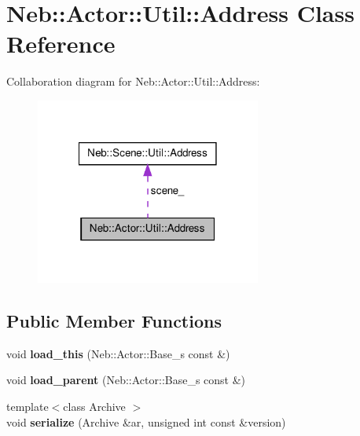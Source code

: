 \hypertarget{classNeb_1_1Actor_1_1Util_1_1Address}{\section{\-Neb\-:\-:\-Actor\-:\-:\-Util\-:\-:\-Address \-Class \-Reference}
\label{classNeb_1_1Actor_1_1Util_1_1Address}
}


\-Collaboration diagram for \-Neb\-:\-:\-Actor\-:\-:\-Util\-:\-:\-Address\-:\nopagebreak
\begin{figure}[H]
\begin{center}
\leavevmode
\includegraphics[width=210pt]{classNeb_1_1Actor_1_1Util_1_1Address__coll__graph}
\end{center}
\end{figure}
\subsection*{\-Public \-Member \-Functions}
\begin{DoxyCompactItemize}
\item 
\hypertarget{classNeb_1_1Actor_1_1Util_1_1Address_a888b40b0cd946b66bd3300d98d8edd0a}{void {\bfseries load\-\_\-this} (\-Neb\-::\-Actor\-::\-Base\-\_\-s const \&)}\label{classNeb_1_1Actor_1_1Util_1_1Address_a888b40b0cd946b66bd3300d98d8edd0a}

\item 
\hypertarget{classNeb_1_1Actor_1_1Util_1_1Address_a53a152cf8e0189b0afb2d2295c0886dc}{void {\bfseries load\-\_\-parent} (\-Neb\-::\-Actor\-::\-Base\-\_\-s const \&)}\label{classNeb_1_1Actor_1_1Util_1_1Address_a53a152cf8e0189b0afb2d2295c0886dc}

\item 
\hypertarget{classNeb_1_1Actor_1_1Util_1_1Address_ad128a12446aadf26c8aee1f0a6df36fc}{{\footnotesize template$<$class Archive $>$ }\\void {\bfseries serialize} (\-Archive \&ar, unsigned int const \&version)}\label{classNeb_1_1Actor_1_1Util_1_1Address_ad128a12446aadf26c8aee1f0a6df36fc}

\end{DoxyCompactItemize}
